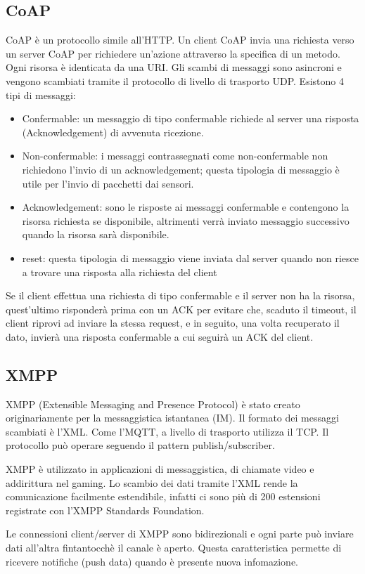 \subsection{CoAP}
CoAP è un protocollo simile all'HTTP. Un client CoAP invia una richiesta verso un server CoAP per richiedere un'azione attraverso la specifica di un metodo. Ogni risorsa è identicata da una URI. Gli scambi di messaggi sono asincroni e vengono scambiati tramite il
protocollo di livello di trasporto UDP.
Esistono 4 tipi di messaggi:
\begin{itemize}
\item Confermable: un messaggio di tipo confermable richiede al server una risposta (Acknowledgement) di avvenuta ricezione.
\item Non-confermable: i messaggi contrassegnati come non-confermable non richiedono l'invio di un acknowledgement; questa tipologia di messaggio è utile per l'invio di pacchetti dai sensori.
\item Acknowledgement: sono le risposte ai messaggi confermable e contengono la risorsa richiesta se disponibile, altrimenti verrà inviato messaggio successivo quando la risorsa sarà disponibile.
\item reset: questa tipologia di messaggio viene inviata dal server quando non riesce a trovare una risposta alla richiesta del client
\end{itemize}
Se il client effettua una richiesta di tipo confermable e il server non ha la risorsa, quest'ultimo risponderà prima con un ACK per evitare che, scaduto il timeout, il client riprovi ad inviare la stessa request, e in seguito, una volta recuperato il dato, invierà una risposta confermable a cui seguirà un ACK del client.

\subsection{XMPP}
XMPP (Extensible Messaging and Presence Protocol) è stato creato originariamente per la messaggistica istantanea (IM).
Il formato dei messaggi scambiati è l'XML. Come l'MQTT, a livello di trasporto utilizza il TCP. Il protocollo può operare seguendo il pattern publish/subscriber.  

XMPP è utilizzato in applicazioni di messaggistica, di chiamate video e addirittura nel gaming. Lo scambio dei dati tramite l'XML rende la comunicazione facilmente estendibile, infatti ci sono più di 200 estensioni registrate con l'XMPP Standards Foundation.

Le connessioni client/server di XMPP sono bidirezionali e ogni parte può inviare dati all'altra fintantocchè il canale è aperto. Questa caratteristica permette di ricevere notifiche (push data) quando è presente nuova infomazione.

